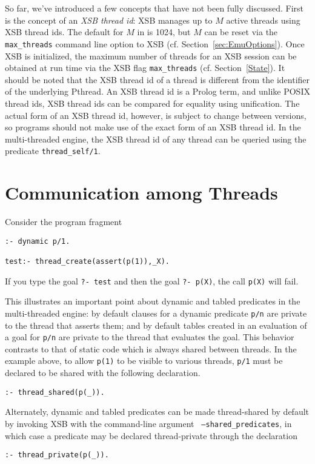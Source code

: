 So far, we've introduced a few concepts that have not been fully
discussed.  First is the concept of an {\em XSB thread id}: XSB
manages up to $M$ active threads using XSB thread ids.  The default
for $M$ in \version{} is 1024, but $M$ can be reset via the {\tt
  max\_threads} command line option to XSB
(cf. Section~\ref{sec:EmuOptions}).  Once XSB is initialized, the
maximum number of threads for an XSB session can be obtained at run
time via the XSB flag {\tt max\_threads} (cf. Section~\ref{State}).
It should be noted that the XSB thread id of a thread is different
from the identifier of the underlying Pthread.  An XSB thread id is a
Prolog term, and unlike POSIX thread ids, XSB thread ids can be
compared for equality using unification.  The actual form of an XSB
thread id, however, is subject to change between versions, so programs
should not make use of the exact form of an XSB thread id.  In the
multi-threaded engine, the XSB thread id of any thread can be queried
using the predicate {\tt thread\_self/1}.

\section{Communication among Threads}

\begin{example}
Consider the program fragment
%
\begin{verbatim}
:- dynamic p/1.

test:- thread_create(assert(p(1)),_X).
\end{verbatim}
If you type the goal {\tt ?- test} and then the goal {\tt ?- p(X)},
the call {\tt p(X)} will fail.  
\end{example}

\noindent
This illustrates an important point about dynamic and tabled
predicates in the multi-threaded engine: by default clauses for a
dynamic predicate {\tt p/n} are private to the thread that asserts
them; and by default tables created in an evaluation of a goal for
{\tt p/n} are private to the thread that evaluates the goal.  This
behavior contrasts to that of static code which is always shared
between threads.  In the example above, to allow {\tt p(1)} to be
visible to various threads, {\tt p/1} must be declared to be shared
with the following declaration.
%
\begin{verbatim}
:- thread_shared(p(_)).
\end{verbatim}
%
Alternately, dynamic and tabled predicates can be made thread-shared
by default by invoking XSB with the command-line argument {\tt
  --shared\_predicates}, in which case a predicate may be declared
thread-private through the declaration
%
\begin{verbatim}
:- thread_private(p(_)).
\end{verbatim}
%

